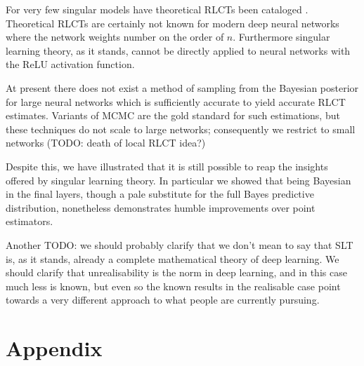 \documentclass{article} %
\begin{document}
For very few singular models have theoretical RLCTs been cataloged \citep{}. Theoretical RLCTs are certainly not known for modern deep neural networks where the network weights number on the order of $n$. Furthermore singular learning theory, as it stands, cannot be directly applied to neural networks with the ReLU activation function. 

At present there does not exist a method of sampling from the Bayesian posterior for large neural networks which is sufficiently accurate to yield accurate RLCT estimates. Variants of MCMC are the gold standard for such estimations, but these techniques do not scale to large networks; consequently we restrict to small networks (TODO: death of local RLCT idea?)


Despite this, we have  illustrated that it is still possible to reap the insights offered by singular learning theory. In particular we showed that being Bayesian in the final layers, though a pale substitute for the full Bayes predictive distribution, nonetheless demonstrates humble improvements over point estimators. 

Another TODO: we should probably clarify that we don't mean to say that SLT is, as it stands, already a complete mathematical theory of deep learning. We should clarify that unrealisability is the norm in deep learning, and in this case much less is known, but even so the known results in the realisable case point towards a very different approach to what people are currently pursuing.
%





\appendix
\section{Appendix}
\end{document}
